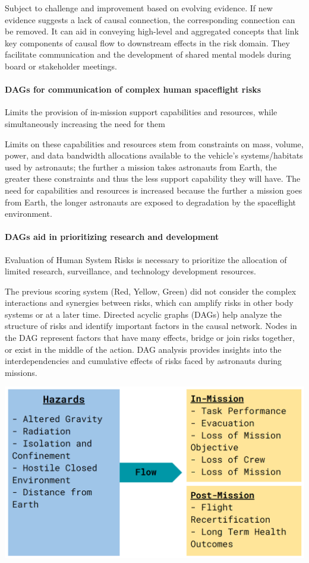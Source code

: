 \documentclass{article}
\begin{document}
Subject to challenge and improvement based on evolving evidence. If new evidence suggests a lack of causal connection, the corresponding connection can be removed.
It can aid in conveying high-level and aggregated concepts that link key components of causal flow to downstream effects in the risk domain.
They facilitate communication and the development of shared mental models during board or stakeholder meetings.

\paragraph{DAGs for communication of complex human spaceflight risks}
Limits the provision of in-mission support capabilities and resources, while simultaneously increasing the need for them

Limits on these capabilities and resources stem from constraints on mass, volume, power, and data bandwidth allocations available to the vehicle’s systems/habitats used by astronauts; the further a mission takes astronauts from Earth, the greater these constraints and thus the less support capability they will have. 
The need for capabilities and resources is increased because the further a mission goes from Earth, the longer astronauts are exposed to degradation by the spaceflight environment.

\paragraph{DAGs aid in prioritizing research and development}
Evaluation of Human System Risks is necessary to prioritize the allocation of limited research, surveillance, and technology development resources.

The previous scoring system (Red, Yellow, Green) did not consider the complex interactions and synergies between risks, which can amplify risks in other body systems or at a later time.
Directed acyclic graphs (DAGs) help analyze the structure of risks and identify important factors in the causal network.
Nodes in the DAG represent factors that have many effects, bridge or join risks together, or exist in the middle of the action.
DAG analysis provides insights into the interdependencies and cumulative effects of risks faced by astronauts during missions.

\includegraphics[width=\textwidth,height=\textheight,keepaspectratio]{flow.png}
\end{document}
